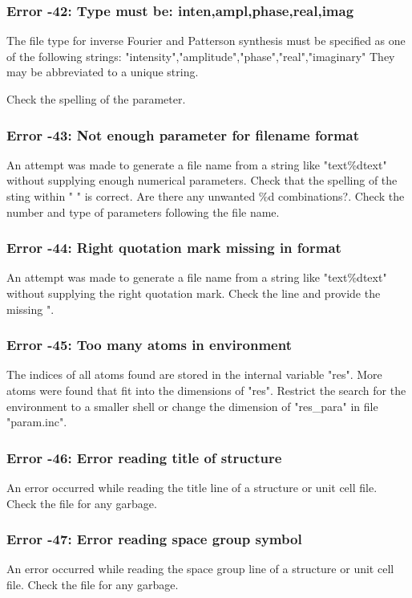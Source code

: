 \subsubsection{Error -42: Type must be: inten,ampl,phase,real,imag}
\par
The file type for inverse Fourier and Patterson synthesis must be 
specified as one of the following strings: 
"intensity","amplitude","phase","real","imaginary" 
They may be abbreviated to a unique string. 
\par
Check the spelling of the parameter. 
\subsubsection{Error -43: Not enough parameter for filename format}
\par
An attempt was made to generate a file name from a string like 
"text\%dtext" without supplying enough numerical parameters. 
Check that the spelling of the sting within " " is correct. Are 
there any unwanted \%d combinations?. Check the number and type 
of parameters following the file name. 
\subsubsection{Error -44: Right quotation mark missing in format}
\par
An attempt was made to generate a file name from a string like 
"text\%dtext" without supplying the right quotation mark. 
Check the line and provide the missing ". 
\subsubsection{Error -45: Too many atoms in environment}
\par
The indices of all atoms found are stored in the internal variable 
"res". More atoms were found that fit into the dimensions of "res". 
Restrict the search for the environment to a smaller shell or 
change the dimension of "res\_para" in file "param.inc". 
\subsubsection{Error -46: Error reading title of structure}
\par
An error occurred while reading the title line of a structure or 
unit cell file. Check the file for any garbage. 
\subsubsection{Error -47: Error reading space group symbol}
\par
An error occurred while reading the space group  line of a structure or 
unit cell file. Check the file for any garbage. 
